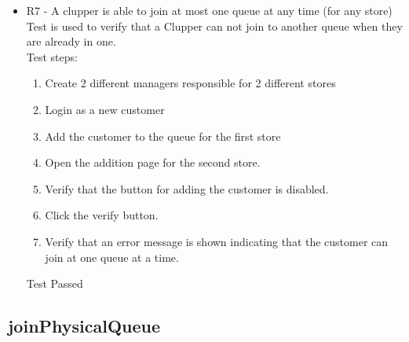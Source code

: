 \begin{itemize}
    \item R7 - A clupper is able to join at most one queue at any time (for any store)\\
    Test is used to verify that a Clupper can not join to another queue when they are already in one.\\
    Test steps:\\
    \begin{enumerate}
        \item Create 2 different managers responsible for 2 different stores
        \item Login as a new customer
        \item Add the customer to the queue for the first store
        \item Open the addition page for the second store.
        \item Verify that the button for adding the customer is disabled.
        \item Click the verify button.
        \item Verify that an error message is shown indicating that the customer can join at one queue at a time.
    \end{enumerate}
    Test Passed
\end{itemize}

\subsection{joinPhysicalQueue}

